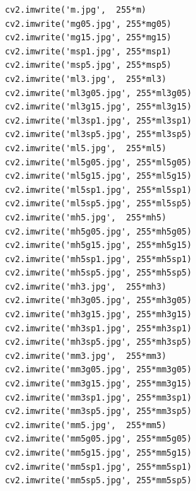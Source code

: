 \documentclass{article}
\begin{document}
\begin{verbatim}
cv2.imwrite('m.jpg',  255*m)
cv2.imwrite('mg05.jpg', 255*mg05)
cv2.imwrite('mg15.jpg', 255*mg15)
cv2.imwrite('msp1.jpg', 255*msp1)
cv2.imwrite('msp5.jpg', 255*msp5)
cv2.imwrite('ml3.jpg',  255*ml3)
cv2.imwrite('ml3g05.jpg', 255*ml3g05)
cv2.imwrite('ml3g15.jpg', 255*ml3g15)
cv2.imwrite('ml3sp1.jpg', 255*ml3sp1)
cv2.imwrite('ml3sp5.jpg', 255*ml3sp5)
cv2.imwrite('ml5.jpg',  255*ml5)
cv2.imwrite('ml5g05.jpg', 255*ml5g05)
cv2.imwrite('ml5g15.jpg', 255*ml5g15)
cv2.imwrite('ml5sp1.jpg', 255*ml5sp1)
cv2.imwrite('ml5sp5.jpg', 255*ml5sp5)
cv2.imwrite('mh5.jpg',  255*mh5)
cv2.imwrite('mh5g05.jpg', 255*mh5g05)
cv2.imwrite('mh5g15.jpg', 255*mh5g15)
cv2.imwrite('mh5sp1.jpg', 255*mh5sp1)
cv2.imwrite('mh5sp5.jpg', 255*mh5sp5)
cv2.imwrite('mh3.jpg',  255*mh3)
cv2.imwrite('mh3g05.jpg', 255*mh3g05)
cv2.imwrite('mh3g15.jpg', 255*mh3g15)
cv2.imwrite('mh3sp1.jpg', 255*mh3sp1)
cv2.imwrite('mh3sp5.jpg', 255*mh3sp5)
cv2.imwrite('mm3.jpg',  255*mm3)
cv2.imwrite('mm3g05.jpg', 255*mm3g05)
cv2.imwrite('mm3g15.jpg', 255*mm3g15)
cv2.imwrite('mm3sp1.jpg', 255*mm3sp1)
cv2.imwrite('mm3sp5.jpg', 255*mm3sp5)
cv2.imwrite('mm5.jpg',  255*mm5)
cv2.imwrite('mm5g05.jpg', 255*mm5g05)
cv2.imwrite('mm5g15.jpg', 255*mm5g15)
cv2.imwrite('mm5sp1.jpg', 255*mm5sp1)
cv2.imwrite('mm5sp5.jpg', 255*mm5sp5)

\end{verbatim}
\end{document}
